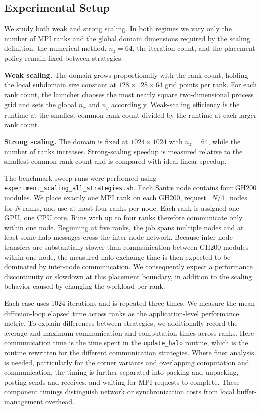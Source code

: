 \documentclass{article}
\begin{document}
\subsection{Experimental Setup}
\label{sec:setup}

We study both weak and strong scaling. In both regimes we vary
only the number of MPI ranks and the global domain dimensions required
by the scaling definition; the numerical method, $n_z=64$, the iteration
count, and the placement policy remain fixed between strategies.

\textbf{Weak scaling.} The domain grows proportionally with the rank
count, holding the local subdomain size constant at $128\times128\times
64$ grid points per rank. For each rank count, the launcher chooses the
most nearly square two-dimensional process grid and sets the global
$n_x$ and $n_y$ accordingly. Weak-scaling efficiency is the runtime at
the smallest common rank count divided by the runtime at each larger
rank count.

\textbf{Strong scaling.} The domain is fixed at $1024 \times 1024$
with $n_z=64$, while the number of ranks increases. Strong-scaling
speedup is measured relative to the smallest common rank count and is
compared with ideal linear speedup.

The benchmark sweep runs were performed using
\texttt{experiment\_scaling\_all\_strategies.sh}.
Each Santis node contains four GH200 modules. We place exactly one MPI
rank on each GH200, request $\lceil N/4\rceil$ nodes for $N$ ranks, and use at most four ranks per node. Each rank is assigned one GPU, one CPU core. Runs with up to four ranks therefore communicate only within one node. Beginning
at five ranks, the job spans multiple nodes and at least some halo
messages cross the inter-node network. Because inter-node transfers are
substantially slower than communication between GH200 modules within one
node, the measured halo-exchange time is then expected to be dominated
by inter-node communication. We consequently expect a performance
discontinuity or slowdown at this placement boundary, in addition to the
scaling behavior caused by changing the workload per rank.

Each case uses 1024 iterations and is repeated three times. We measure
the mean diffusion-loop elapsed time across ranks as the application-level performance
metric. To explain differences between strategies, we additionally
record the average and maximum communication and computation times
across ranks. Here communication time is the time spent in the
\texttt{update\_halo} routine, which is the routine rewritten for the
different communication strategies. Where finer analysis is needed, particularly for the corner variants and overlapping computation and communication, the timing is further
separated into packing and unpacking, posting sends and receives, and
waiting for MPI requests to complete. These component timings distinguish
network or synchronization costs from local buffer-management overhead.
\end{document}
